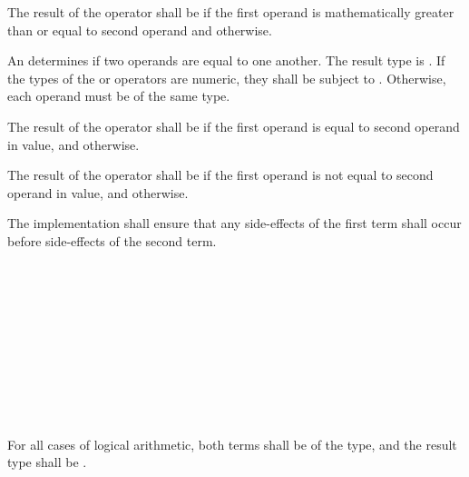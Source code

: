 \specsubsubitem
The result of the \terminal{>=} operator shall be  if the first
operand is mathematically greater than or equal to second operand
and  otherwise.

\specsubsubitem
An  determines if two operands are equal to one
another. The result type is . If the types of the \terminal{==}
or \terminal{!=} operators are numeric, they shall be subject to
. Otherwise, each operand must be of the same type.

\specsubsubitem
The result of the \terminal{==} operator shall be  if the first
operand is equal to second operand in value, and  otherwise.

\specsubsubitem
The result of the \terminal{!=} operator shall be  if the first
operand is not equal to second operand in value, and  otherwise.

\specsubsubitem
The implementation shall ensure that any side-effects of the first term shall
occur before side-effects of the second term.


\begin{grammar}
 \\
	 \\
	 \terminal{\&\&}  \\

 \\
	 \\
	 \terminal{\textasciicircum\textasciicircum}  \\

 \\
	 \\
	 \terminal{||}  \\
\end{grammar}

\specsubsubitem
For all cases of logical arithmetic, both terms shall be of the 
type, and the result type shall be .

